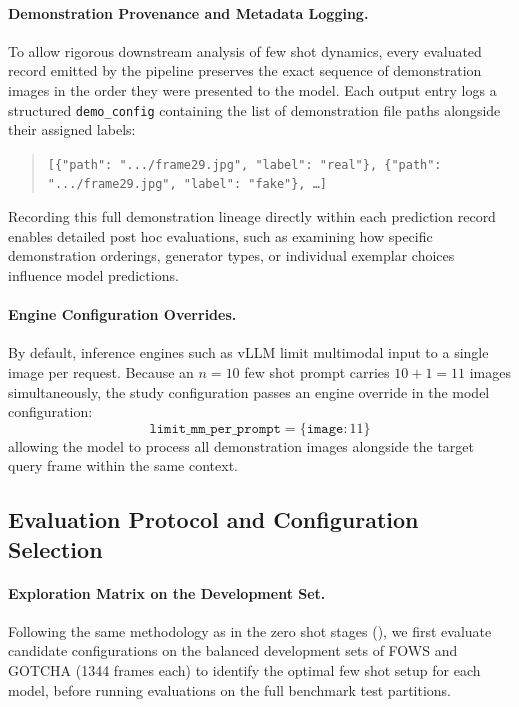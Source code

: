 \paragraph{Demonstration Provenance and Metadata Logging.}
To allow rigorous downstream analysis of few shot dynamics, every evaluated record emitted by the pipeline preserves the exact sequence of demonstration images in the order they were presented to the model. Each output entry logs a structured \texttt{demo\_config} containing the list of demonstration file paths alongside their assigned labels:
\begin{quote}
    \texttt{\scriptsize [\{"path": ".../frame29.jpg", "label": "real"\}, \{"path": ".../frame29.jpg", "label": "fake"\}, \dots]}
\end{quote}
Recording this full demonstration lineage directly within each prediction record enables detailed post hoc evaluations, such as examining how specific demonstration orderings, generator types, or individual exemplar choices influence model predictions.

\paragraph{Engine Configuration Overrides.}
By default, inference engines such as vLLM limit multimodal input to a single image per request. Because an $n = 10$ few shot prompt carries $10 + 1 = 11$ images simultaneously, the study configuration passes an engine override in the model configuration:
\begin{equation}
    \texttt{limit\_mm\_per\_prompt} = \{\texttt{image}: 11\}
\end{equation}
allowing the model to process all demonstration images alongside the target query frame within the same context.

\subsection{Evaluation Protocol and Configuration Selection}
\label{subsec:fewshot_selection}

\paragraph{Exploration Matrix on the Development Set.}
Following the same methodology as in the zero shot stages (), we first evaluate candidate configurations on the balanced development sets of FOWS and GOTCHA (\num{1344} frames each) to identify the optimal few shot setup for each model, before running evaluations on the full benchmark test partitions.

